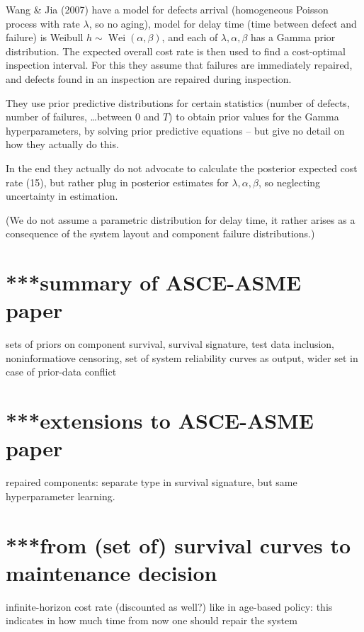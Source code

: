 \documentclass[authoryear]{elsarticle}
\newcommand{\wei}{\operatorname{Wei}} %
\begin{document}
Wang \& Jia (2007) have a model for defects arrival (homogeneous Poisson process with rate $\lambda$, so no aging),
model for delay time (time between defect and failure) is Weibull $h \sim \wei(\alpha,\beta)$,
and each of $\lambda, \alpha, \beta$ has a Gamma prior distribution.
The expected overall cost rate is then used to find a cost-optimal inspection interval.
For this they assume that failures are immediately repaired,
and defects found in an inspection are repaired during inspection.

They use prior predictive distributions for certain statistics (number of defects, number of failures, \ldots between $0$ and $T$)
to obtain prior values for the Gamma hyperparameters,
by solving prior predictive equations -- but give no detail on how they actually do this.

In the end they actually do not advocate to calculate the posterior expected cost rate (15),
but rather plug in posterior estimates for $\lambda, \alpha, \beta$,
so neglecting uncertainty in estimation.

(We do not assume a parametric distribution for delay time,
it rather arises as a consequence of the system layout and component failure distributions.)


\section{***summary of ASCE-ASME paper}

sets of priors on component survival,
survival signature,
test data inclusion,
noninformatiove censoring,
set of system reliability curves as output,
wider set in case of prior-data conflict


\section{***extensions to ASCE-ASME paper}

repaired components: separate type in survival signature,
but same hyperparameter learning.

\section{***from (set of) survival curves to maintenance decision}

infinite-horizon cost rate (discounted as well?)
like in age-based policy:
this indicates in how much time from now one should repair the system
\end{document}
